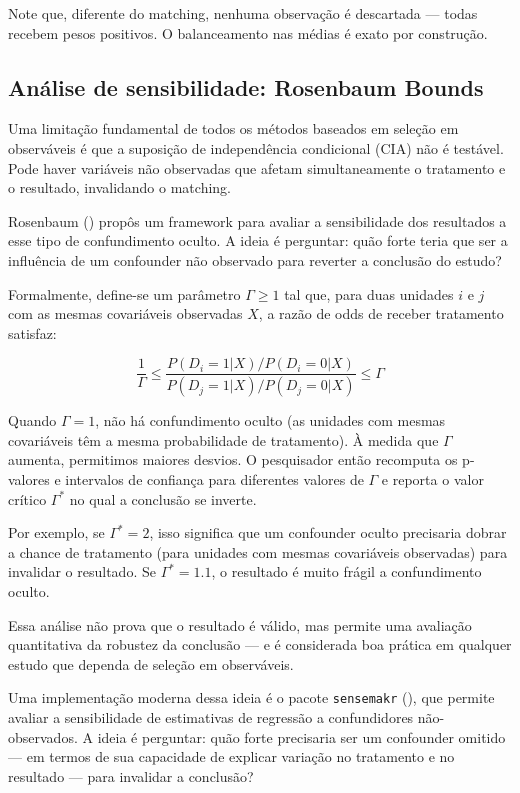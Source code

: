 \documentclass[
]{article}
\begin{document}
Note que, diferente do matching, nenhuma observação é descartada --- todas recebem pesos positivos. O balanceamento nas médias é exato por construção.

\subsection{Análise de sensibilidade: Rosenbaum Bounds}\label{anuxe1lise-de-sensibilidade-rosenbaum-bounds}

Uma limitação fundamental de todos os métodos baseados em seleção em observáveis é que a suposição de independência condicional (CIA) não é testável. Pode haver variáveis não observadas que afetam simultaneamente o tratamento e o resultado, invalidando o matching.

Rosenbaum () propôs um framework para avaliar a sensibilidade dos resultados a esse tipo de confundimento oculto. A ideia é perguntar: quão forte teria que ser a influência de um confounder não observado para reverter a conclusão do estudo?

Formalmente, define-se um parâmetro \(\Gamma \geq 1\) tal que, para duas unidades \(i\) e \(j\) com as mesmas covariáveis observadas \(X\), a razão de odds de receber tratamento satisfaz:

\[\frac{1}{\Gamma} \leq \frac{P(D_i = 1|X)/P(D_i = 0|X)}{P(D_j = 1|X)/P(D_j = 0|X)} \leq \Gamma\]

Quando \(\Gamma = 1\), não há confundimento oculto (as unidades com mesmas covariáveis têm a mesma probabilidade de tratamento). À medida que \(\Gamma\) aumenta, permitimos maiores desvios. O pesquisador então recomputa os p-valores e intervalos de confiança para diferentes valores de \(\Gamma\) e reporta o valor crítico \(\Gamma^*\) no qual a conclusão se inverte.

Por exemplo, se \(\Gamma^* = 2\), isso significa que um confounder oculto precisaria dobrar a chance de tratamento (para unidades com mesmas covariáveis observadas) para invalidar o resultado. Se \(\Gamma^* = 1.1\), o resultado é muito frágil a confundimento oculto.

Essa análise não prova que o resultado é válido, mas permite uma avaliação quantitativa da robustez da conclusão --- e é considerada boa prática em qualquer estudo que dependa de seleção em observáveis.

Uma implementação moderna dessa ideia é o pacote \texttt{sensemakr} (), que permite avaliar a sensibilidade de estimativas de regressão a confundidores não-observados. A ideia é perguntar: quão forte precisaria ser um confounder omitido --- em termos de sua capacidade de explicar variação no tratamento e no resultado --- para invalidar a conclusão?
\end{document}
